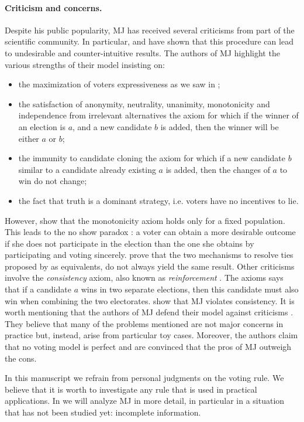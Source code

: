 \paragraph{Criticism and concerns.}
Despite his public popularity, \ac{MJ} has received several criticisms from part of the scientific community. In particular, \citet{Felsenthal2008, Zahid2009} and \citet{Laslier2018} have shown that this procedure can lead to undesirable and counter-intuitive results.
The authors of \ac{MJ} highlight the various strengths of their model insisting on:
\begin{itemize}
	\item the maximization of voters expressiveness \textemdash as we saw in ;
	\item the satisfaction of anonymity, neutrality, unanimity, monotonicity and independence from irrelevant alternatives \textemdash the axiom for which if the winner of an election is $a$, and a new candidate $b$ is added, then the winner will be either $a$ or $b$;
	\item the immunity to candidate cloning \textemdash the axiom for which if a new candidate $b$ similar to a candidate already existing $a$ is added, then the changes of $a$ to win do not change;
	\item the fact that truth is a dominant strategy, i.e. voters have no incentives to lie. 
\end{itemize}

However, \citet{Felsenthal2008,Laslier2018} show that the monotonicity axiom holds only for a fixed population. This leads to the no show paradox \citep{Fishburn1983}: a voter can obtain a more desirable outcome if she does not participate in the election than the one she obtains by participating and voting sincerely. 
\citet{Felsenthal2008,Zahid2009} prove that the two mechanisms to resolve ties proposed by \citet{Balinski2011} as equivalents, do not always yield the same result. 
Other criticisms involve the \textit{consistency} axiom, also known as \textit{reinforcement} \citep{Young1974,Young1975}. The axioms says that if a candidate $a$ wins in two separate elections, then this candidate must also win when combining the two electorates. \citet{Felsenthal2008} show that \ac{MJ} violates consistency.
It is worth mentioning that the authors of \ac{MJ} defend their model against criticisms \citep{Balinski2011,Balinski2019}. They believe that many of the problems mentioned are not major concerns in practice but, instead, arise from particular toy cases. Moreover, the authors claim that no voting model is perfect and are convinced that the pros of MJ outweigh the cons.

In this manuscript we refrain from personal judgments on the voting rule. We believe that it is worth to investigate any rule that is used in practical applications. In  we will analyze \ac{MJ} in more detail, in particular in a situation that has not been studied yet: incomplete information.










